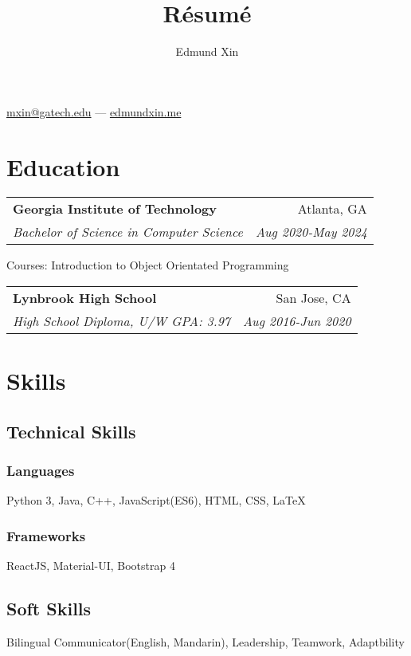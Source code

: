 \documentclass[letterpaper,11pt]{article}
\makeatletter
\renewcommand{\maketitle}{
  \begin{center}
  {\huge\bfseries
  \theauthor}

  \vspace{0.25em}

  \href{mailto:mxin@gatech.edu}{mxin@gatech.edu} --- \href{https://edmundxin.me}{edmundxin.me}

  \end{center}
}
\newcommand{\resumeSubheading}[4]{
  \vspace{0.25em}
  \begin{tabular*}{0.97\textwidth}[t]{l@{\extracolsep{\fill}}r}
    \textbf{#1} & #2 \\
    \textit{\small#3} & \textit{\small #4} \\
  \end{tabular*}\vspace{0.25em}
}
\makeatother
\begin{document}
\title{R\'esum\'e}
\author{Edmund Xin}

\maketitle

\section{Education}

\resumeSubheading{Georgia Institute of Technology}
{Atlanta, GA}{Bachelor of Science in Computer Science
}{Aug 2020-May 2024}
Courses: Introduction to Object Orientated Programming

\resumeSubheading{Lynbrook High School}
{San Jose, CA}{High School Diploma, U/W GPA: 3.97}{Aug 2016-Jun 2020}

\section{Skills}

\begin{multicols}{2}
\subsection{Technical Skills}

\subsubsection{Languages}

\begin{adjustwidth}{4em}{}
Python 3, Java, C++, JavaScript(ES6), HTML, CSS, {\LaTeX}
\end{adjustwidth}

\subsubsection{Frameworks}

\begin{adjustwidth}{4em}{}
ReactJS, Material-UI, Bootstrap 4
\end{adjustwidth}

\columnbreak

\subsection{Soft Skills}

\begin{adjustwidth}{2em}{}
Bilingual Communicator(English, Mandarin), Leadership, Teamwork, Adaptbility
\end{adjustwidth}

\end{multicols}
\end{document}
